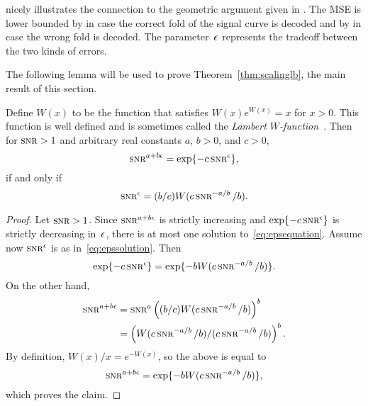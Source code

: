 \begin{remark}
  \label{rem:geomlb}
   nicely illustrates the connection to the geometric
  argument given in . The MSE is lower bounded by
   in case the correct fold of the signal curve is decoded
  and by  in case the wrong fold is decoded. The
  parameter~$\epsilon$ represents the tradeoff between the two kinds of errors.
\end{remark}

The following lemma will be used to prove Theorem~\ref{thm:scalinglb}, the main
result of this section.

\begin{lemma}
  \label{lem:epssolution}
  Define $W(x)$ to be the function that satisfies $W(x)e^{W(x)} = x$ for $x >
  0$.  This function is well defined and is sometimes called the \emph{Lambert
  $W$-function}~\textnormal{\cite{CorlessGHJK1996}}. Then for $\snr > 1$ and
  arbitrary real constants $a$, $b>0$, and $c > 0$, 
  \begin{equation}
    \label{eq:epsequation}
    \snr^{a+b\e} = \exp\{-c\snr^\e\},
  \end{equation}
  if and only if
  \begin{equation}
    \label{eq:epssolution}
    \snr^\e = (b/c) W(c\snr^{-a/b} / b).
  \end{equation}
\end{lemma}

\begin{proof}
  Let $\snr>1$. Since $\snr^{a+b\e}$ is strictly increasing and
  $\exp\{-c \snr^\e\}$ is strictly decreasing in~$\epsilon$, there is at most one
  solution to~\eqref{eq:epsequation}.  Assume now $\snr^\e$ is as
  in~\eqref{eq:epssolution}. Then
  \begin{equation*}
    \exp\{-c \snr^\e\} = \exp\{-b W(c \snr^{-a/b}/b)\}.
  \end{equation*}
  On the other hand,
  \begin{align*}
    \snr^{a+b\e} &= \snr^a \left( (b/c) W(c\snr^{-a/b}/b) \right)^b \\
    &= \left( W(c\snr^{-a/b}/b) / (c\snr^{-a/b}/b) \right)^b.
  \end{align*}
  By definition, $W(x)/x = e^{-W(x)}$, so the above is equal to
  \begin{equation*}
    \snr^{a+b\e} = \exp\{-bW(c \snr^{-a/b}/b)\},
  \end{equation*}
  which proves the claim.
\end{proof}


